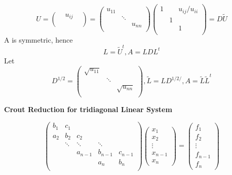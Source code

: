 \documentclass[11pt]{article}
\begin{document}
\begin{equation*}
U =
\begin{pmatrix}
&u_{ij}\\
&&\\
\end{pmatrix}=
\begin{pmatrix}
u_{11}&&\\
&\ddots&\\
&&u_{nn}\\
\end{pmatrix}
\begin{pmatrix}
1&&u_{ij}/u_{ii}\\
&1&\\
&&1\\
\end{pmatrix}=D\tilde{U}
\end{equation*}
A is symmetric, hence 
\begin{equation*}
L=\tilde{U}^t, A=LDL^t
\end{equation*}
Let 
\begin{equation*}
D^{1/2}=
\begin{pmatrix}
\sqrt{u_{11}}&&\\
&\ddots&\\
&&\sqrt{u_{nn}}\\
\end{pmatrix}, \tilde{L}=LD^{1/2/}, A=\tilde{L}\tilde{L}^t
\end{equation*}

\textbf{Crout Reduction for tridiagonal Linear System}

\begin{equation*}
\begin{pmatrix}
b_1 & c_1    &        &        &\\
a_2 & b_2    & c_2    &        &\\
    & \ddots & \ddots & \ddots &\\
    &        & a_{n-1}& b_{n-1}& c_{n-1} \\
    &        &        & a_n    & b_n\\
\end{pmatrix}
\begin{pmatrix}
x_1\\
x_2\\
\vdots\\
x_{n-1}\\
x_n
\end{pmatrix}=
\begin{pmatrix}
f_1\\
f_2\\
\vdots\\
f_{n-1}\\
f_n
\end{pmatrix}
\end{equation*}
\end{document}
